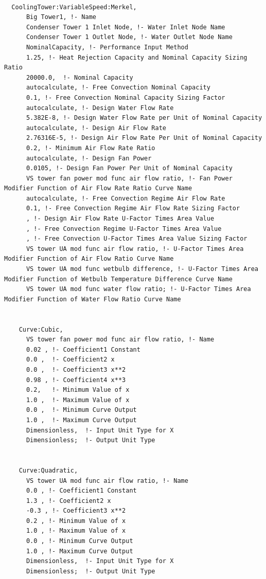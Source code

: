 \begin{lstlisting}

  CoolingTower:VariableSpeed:Merkel,
      Big Tower1, !- Name
      Condenser Tower 1 Inlet Node, !- Water Inlet Node Name
      Condenser Tower 1 Outlet Node, !- Water Outlet Node Name
      NominalCapacity, !- Performance Input Method
      1.25, !- Heat Rejection Capacity and Nominal Capacity Sizing Ratio
      20000.0,  !- Nominal Capacity
      autocalculate, !- Free Convection Nominal Capacity
      0.1, !- Free Convection Nominal Capacity Sizing Factor
      autocalculate, !- Design Water Flow Rate
      5.382E-8, !- Design Water Flow Rate per Unit of Nominal Capacity
      autocalculate, !- Design Air Flow Rate
      2.76316E-5, !- Design Air Flow Rate Per Unit of Nominal Capacity
      0.2, !- Minimum Air Flow Rate Ratio
      autocalculate, !- Design Fan Power
      0.0105, !- Design Fan Power Per Unit of Nominal Capacity
      VS tower fan power mod func air flow ratio, !- Fan Power Modifier Function of Air Flow Rate Ratio Curve Name
      autocalculate, !- Free Convection Regime Air Flow Rate
      0.1, !- Free Convection Regime Air Flow Rate Sizing Factor
      , !- Design Air Flow Rate U-Factor Times Area Value
      , !- Free Convection Regime U-Factor Times Area Value
      , !- Free Convection U-Factor Times Area Value Sizing Factor
      VS tower UA mod func air flow ratio, !- U-Factor Times Area Modifier Function of Air Flow Ratio Curve Name
      VS tower UA mod func wetbulb difference, !- U-Factor Times Area Modifier Function of Wetbulb Temperature Difference Curve Name
      VS tower UA mod func water flow ratio; !- U-Factor Times Area Modifier Function of Water Flow Ratio Curve Name


    Curve:Cubic,
      VS tower fan power mod func air flow ratio, !- Name
      0.02 , !- Coefficient1 Constant
      0.0 ,  !- Coefficient2 x
      0.0 ,  !- Coefficient3 x**2
      0.98 , !- Coefficient4 x**3
      0.2,   !- Minimum Value of x
      1.0 ,  !- Maximum Value of x
      0.0 ,  !- Minimum Curve Output
      1.0 ,  !- Maximum Curve Output
      Dimensionless,  !- Input Unit Type for X
      Dimensionless;  !- Output Unit Type


    Curve:Quadratic,
      VS tower UA mod func air flow ratio, !- Name
      0.0 , !- Coefficient1 Constant
      1.3 , !- Coefficient2 x
      -0.3 , !- Coefficient3 x**2
      0.2 , !- Minimum Value of x
      1.0 , !- Maximum Value of x
      0.0 , !- Minimum Curve Output
      1.0 , !- Maximum Curve Output
      Dimensionless,  !- Input Unit Type for X
      Dimensionless;  !- Output Unit Type



\end{lstlisting}
